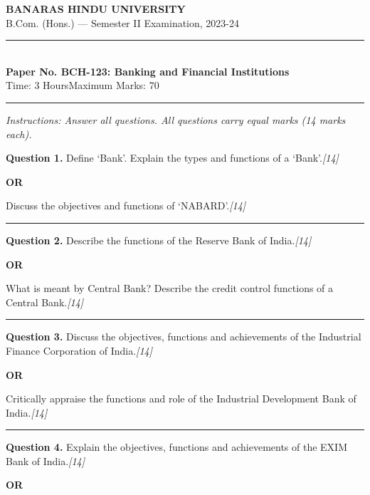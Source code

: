 \documentclass[11pt,a4paper]{article}
\newcommand{\pts}[1]{\hfill   \textit{[#1]}}
\begin{document}
\begin{center}
  {\large\bfseries BANARAS HINDU UNIVERSITY}\\[2pt]
  {\normalsize B.Com. (Hons.) --- Semester II Examination, 2023-24}\\[6pt]
  \rule{0.8\linewidth}{0.5pt}\\[6pt]
  {\large\bfseries Paper No. BCH-123: Banking and Financial Institutions}\\[4pt]
  {\normalsize Time: 3 Hours\hfill Maximum Marks: 70}
\end{center}

\rule{\linewidth}{0.4pt}

\smallskip



\noindent   \textit{Instructions: Answer all questions. All questions carry equal marks (14 marks each).}

\bigskip




\noindent   \textbf{Question 1.}
Define `Bank'. Explain the types and functions of a `Bank'.\pts{14}

\centerline{   \textbf{OR}}

Discuss the objectives and functions of `NABARD'.\pts{14}

\medskip\rule{\linewidth}{0.2pt}




\noindent   \textbf{Question 2.}
Describe the functions of the Reserve Bank of India.\pts{14}

\centerline{   \textbf{OR}}

What is meant by Central Bank? Describe the credit control functions of a Central Bank.\pts{14}

\medskip\rule{\linewidth}{0.2pt}




\noindent   \textbf{Question 3.}
Discuss the objectives, functions and achievements of the Industrial Finance Corporation of India.\pts{14}

\centerline{   \textbf{OR}}

Critically appraise the functions and role of the Industrial Development Bank of India.\pts{14}

\medskip\rule{\linewidth}{0.2pt}




\noindent   \textbf{Question 4.}
Explain the objectives, functions and achievements of the EXIM Bank of India.\pts{14}

\centerline{   \textbf{OR}}
\end{document}
